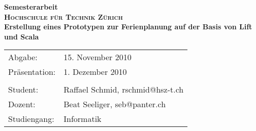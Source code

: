 \begin{titlepage}
    \begin{center}
    \huge \textbf{\textsf{Semesterarbeit}} \\
    \vspace{2cm}
    \LARGE\textbf{\textsc{Hochschule f\"ur Technik Z\"urich}}\\
    \vspace{1cm}
    \normalsize
    \vspace{1.5cm}
    \large \textbf{Erstellung eines Prototypen zur Ferienplanung auf der Basis von Lift und Scala}\\
    \vspace{5cm}
    \end{center}
 \normalsize{
    \begin{tabular}{ll}
    	Abgabe: & 15. November 2010\\
	Pr\"asentation: & 1. Dezember 2010\\\\
    	Student: &Raffael Schmid, rschmid@hsz-t.ch\\
     	Dozent: & Beat Seeliger, seb@panter.ch \\
    	Studiengang: & Informatik\\
    \end{tabular}\\
    }
\end{titlepage}